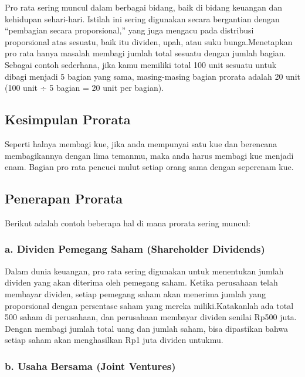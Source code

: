 \documentclass[
]{book}
\begin{document}
Pro rata sering muncul dalam berbagai bidang, baik di bidang keuangan dan kehidupan sehari-hari. Istilah ini sering digunakan secara bergantian dengan ``pembagian secara proporsional,'' yang juga mengacu pada distribusi proporsional atas sesuatu, baik itu dividen, upah, atau suku bunga.Menetapkan pro rata hanya masalah membagi jumlah total sesuatu dengan jumlah bagian. Sebagai contoh sederhana, jika kamu memiliki total 100 unit sesuatu untuk dibagi menjadi 5 bagian yang sama, masing-masing bagian prorata adalah 20 unit (100 unit ÷ 5 bagian = 20 unit per bagian).

\hypertarget{kesimpulan-prorata}{%
\subsection{Kesimpulan Prorata}\label{kesimpulan-prorata}}

Seperti halnya membagi kue, jika anda mempunyai satu kue dan berencana membagikannya dengan lima temanmu, maka anda harus membagi kue menjadi enam. Bagian pro rata pencuci mulut setiap orang sama dengan seperenam kue.

\hypertarget{penerapan-prorata}{%
\subsection{Penerapan Prorata}\label{penerapan-prorata}}

Berikut adalah contoh beberapa hal di mana prorata sering muncul:

\hypertarget{a.-dividen-pemegang-saham-shareholder-dividends}{%
\subsubsection*{a. Dividen Pemegang Saham (Shareholder Dividends)}\label{a.-dividen-pemegang-saham-shareholder-dividends}}

Dalam dunia keuangan, pro rata sering digunakan untuk menentukan jumlah dividen yang akan diterima oleh pemegang saham. Ketika perusahaan telah membayar dividen, setiap pemegang saham akan menerima jumlah yang proporsional dengan persentase saham yang mereka miliki.Katakanlah ada total 500 saham di perusahaan, dan perusahaan membayar dividen senilai Rp500 juta. Dengan membagi jumlah total uang dan jumlah saham, bisa dipastikan bahwa setiap saham akan menghasilkan Rp1 juta dividen untukmu.

\hypertarget{b.-usaha-bersama-joint-ventures}{%
\subsubsection*{b. Usaha Bersama (Joint Ventures)}\label{b.-usaha-bersama-joint-ventures}}
\end{document}
